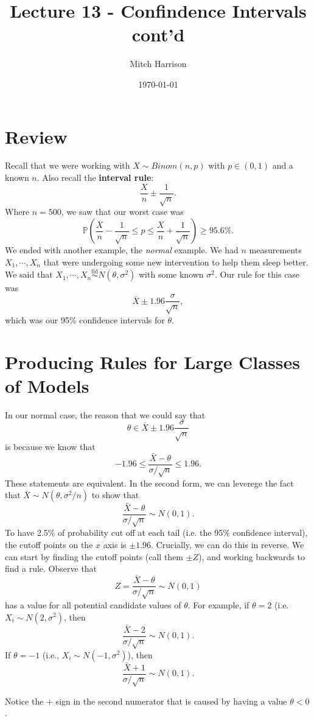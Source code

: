\documentclass[titlepage, 12pt, leqno]{article}
\title{\Huge{Lecture 13 - Confindence Intervals cont'd}}
\author{\large{Mitch Harrison}}
\date{\today}
\begin{document}
\setlength{\parskip}{1\baselineskip}
\setlength{\parindent}{15pt}
\maketitle
\tableofcontents
\newpage


\section{Review}

Recall that we were working with $X \sim Binom(n,p)$ with $p \in (0,1)$
and a known $n$. Also recall the \textbf{interval rule}:
\[
\frac{X}{n} \pm \frac{1}{\sqrt{n}}.
\]
Where $n=500$, we saw that our worst case was
\[
\mathbb{P}\left(\frac{X}{n} - \frac{1}{\sqrt{n}} \le p \le
    \frac{X}{n} + \frac{1}{\sqrt{n}}\right) \ge 95.6\%.
\]
We ended with another example, the \textit{normal} example. We had $n$ 
measurements $X_{1}, \cdots , X_{n}$ that were undergoing some new intervention
to help them sleep better. We said that 
$X_{1}, \cdots ,X_{n}\overset{\mathrm{iid}}{\sim}N(\theta,\sigma^{2})$ with some
known $\sigma^{2}$. Our rule for this case was
\[
\bar X \pm 1.96 \frac{\sigma}{\sqrt{n}},
\]
which was our 95\% confidence intervals for $\theta$.

\pagebreak
\section{Producing Rules for Large Classes of Models}
In our normal case, the reason that we could say that
\[
\theta \in  \bar X \pm 1.96 \frac{\sigma}{\sqrt{n}}
\]
is because we know that
\[
-1.96 \le \frac{\bar X - \theta}{\sigma / \sqrt{n}} \le 1.96.
\]
These statements are equivalent. In the second form, we can leverege the fact
that $\bar X \sim N(\theta, \sigma^{2}/n)$ to show that
\[
\frac{\bar X - \theta}{\sigma / \sqrt{n}} \sim N(0,1).
\]
To have 2.5\% of probability cut off at each tail (i.e. the 95\% confidence
interval), the cutoff points on the $x$ axis is $ \pm 1.96$. Crucially, we can
do this in reverse. We can start by finding the cutoff points (call them
$ \pm Z$), and working backwards to find a rule. Observe that
\[
Z = \frac{\bar X - \theta}{\sigma/ \sqrt{n}} \sim N(0,1)
\]
has a value for all potential candidate values of $\theta$. For example, if
$\theta = 2$ (i.e. $X_{i} \sim N(2, \sigma^{2})$, then
\[
\frac{\bar X - 2}{\sigma / \sqrt{n}} \sim N(0,1).
\]
If $\theta = -1$ (i.e., $X_{i} \sim N(-1, \sigma^{2})$), then
\[
\frac{\bar X + 1}{\sigma / \sqrt{n}} \sim N(0,1).
\]
\begin{note}
    Notice the $+$ sign in the second numerator that is caused by having a 
    value $\theta < 0$.
\end{note}
\end{document}
